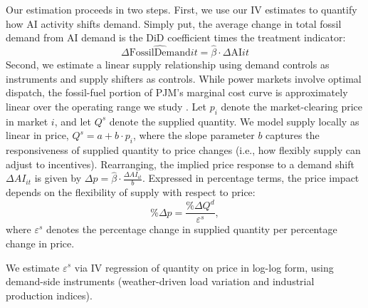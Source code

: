 \documentclass[sigconf,authordraft]{acmart}
\newcommand{\nb}[1]{\textcolor{blue}{NB[#1]}}
\begin{document}
Our estimation proceeds in two steps. First, we use our IV estimates to quantify how AI activity shifts demand. Simply put, the average change in total fossil demand from AI demand is the DiD coefficient times the treatment indicator:
\begin{equation}
\Delta \widehat{\text{FossilDemand}}{it} = \hat{\beta} \cdot \Delta \text{AI}{it}
\label{eq:demand-change}
\end{equation}
Second, we estimate a linear supply relationship using demand controls as instruments and supply shifters as controls. While power markets involve optimal dispatch, the fossil-fuel portion of PJM’s marginal cost curve is approximately linear over the operating range we study \cite{PJM_DataMiner2_2025}.
Let $p_i$ denote the market-clearing price in market $i$, and let $Q^s$ denote
the supplied quantity. We model supply locally as linear in price,
$Q^s = a + b \cdot p_i$, where the slope parameter $b$ captures the
responsiveness of supplied quantity to price changes (i.e., how flexibly
supply can adjust to incentives). Rearranging, the implied price response to a
demand shift $\Delta AI_{it}$ is given by
$\Delta p = \hat{\beta} \cdot \frac{\Delta AI_{it}}{b}$. Expressed in percentage
terms, the price impact depends on the flexibility of supply with respect to
price:
\begin{equation}
\% \Delta p = \frac{\% \Delta Q^d}{\varepsilon^s},
\label{eq:price-impact-elasticity}
\end{equation}
where $\varepsilon^s$ denotes the percentage change in supplied quantity per
percentage change in price.


We estimate $\varepsilon^s$ via IV regression of quantity on price in log-log form, using demand-side instruments (weather-driven load variation and industrial production indices).
\end{document}
